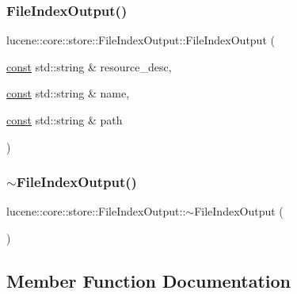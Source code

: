 \subsubsection{\texorpdfstring{File\+Index\+Output()}{FileIndexOutput()}}
{\footnotesize\ttfamily lucene\+::core\+::store\+::\+File\+Index\+Output\+::\+File\+Index\+Output (\begin{DoxyParamCaption}\item[{\mbox{\hyperlink{ZlibCrc32_8h_a2c212835823e3c54a8ab6d95c652660e}{const}} std\+::string \&}]{resource\+\_\+desc,  }\item[{\mbox{\hyperlink{ZlibCrc32_8h_a2c212835823e3c54a8ab6d95c652660e}{const}} std\+::string \&}]{name,  }\item[{\mbox{\hyperlink{ZlibCrc32_8h_a2c212835823e3c54a8ab6d95c652660e}{const}} std\+::string \&}]{path }\end{DoxyParamCaption})\hspace{0.3cm}{\ttfamily [inline]}}

\mbox{\label{classlucene_1_1core_1_1store_1_1FileIndexOutput_a3c2f439b5919daf168b757d515422ec9}} 
\subsubsection{\texorpdfstring{$\sim$\+File\+Index\+Output()}{~FileIndexOutput()}}
{\footnotesize\ttfamily lucene\+::core\+::store\+::\+File\+Index\+Output\+::$\sim$\+File\+Index\+Output (\begin{DoxyParamCaption}{ }\end{DoxyParamCaption})\hspace{0.3cm}{\ttfamily [inline]}}



\subsection{Member Function Documentation}
\mbox{\label{classlucene_1_1core_1_1store_1_1FileIndexOutput_ae07d09f8fa61109e46f069a138f8560b}} 
